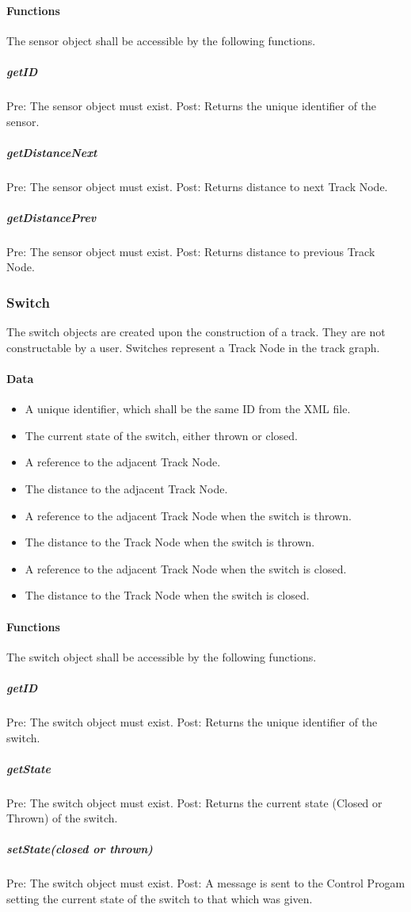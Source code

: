 \documentclass[a4paper,11pt,notitlepage]{article}
\def\CS{Control Progam\xspace} \def\LC{Local Copy of Train State\xspace} \def\TN{Track Node\xspace}
\begin{document}
\paragraph{Functions}
The sensor object shall be accessible by the following functions.
\subparagraph{getID} Pre: The sensor object must exist. Post: Returns the unique identifier of the sensor.
\subparagraph{getDistanceNext} Pre: The sensor object must exist. Post: Returns distance to next \TN.
\subparagraph{getDistancePrev} Pre: The sensor object must exist. Post: Returns distance to previous \TN.

\subsubsection{Switch}
The switch objects are created upon the construction of a track. They are not constructable by a user. Switches represent a \TN in the track graph.
\paragraph{Data}
\begin{itemize}
\item A unique identifier, which shall be the same ID from the XML file.
\item The current state of the switch, either thrown or closed.
\item A reference to the adjacent \TN.
\item The distance to the adjacent \TN.
\item A reference to the adjacent \TN when the switch is thrown.
\item The distance to the \TN when the switch is thrown.
\item A reference to the adjacent \TN when the switch is closed.
\item The distance to the \TN when the switch is closed.
\end{itemize}
\paragraph{Functions}
The switch object shall be accessible by the following functions.
\subparagraph{getID} Pre: The switch object must exist. Post: Returns the unique identifier of the switch.
\subparagraph{getState} Pre: The switch object must exist. Post: Returns the current state (Closed or Thrown) of the switch.
\subparagraph{setState(closed or thrown)} Pre: The switch object must exist. Post: A message is sent to the \CS setting the current state of the switch to that which was given.
\end{document}
